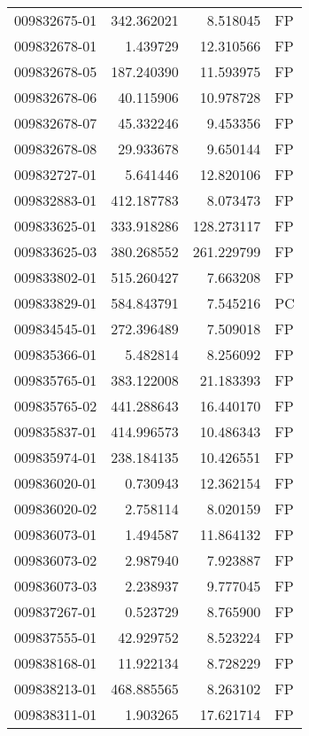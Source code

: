 \begin{tabular}{lrrl}
009832675-01 &  342.362021 &       8.518045 &   FP \\
009832678-01 &    1.439729 &      12.310566 &   FP \\
009832678-05 &  187.240390 &      11.593975 &   FP \\
009832678-06 &   40.115906 &      10.978728 &   FP \\
009832678-07 &   45.332246 &       9.453356 &   FP \\
009832678-08 &   29.933678 &       9.650144 &   FP \\
009832727-01 &    5.641446 &      12.820106 &   FP \\
009832883-01 &  412.187783 &       8.073473 &   FP \\
009833625-01 &  333.918286 &     128.273117 &   FP \\
009833625-03 &  380.268552 &     261.229799 &   FP \\
009833802-01 &  515.260427 &       7.663208 &   FP \\
009833829-01 &  584.843791 &       7.545216 &   PC \\
009834545-01 &  272.396489 &       7.509018 &   FP \\
009835366-01 &    5.482814 &       8.256092 &   FP \\
009835765-01 &  383.122008 &      21.183393 &   FP \\
009835765-02 &  441.288643 &      16.440170 &   FP \\
009835837-01 &  414.996573 &      10.486343 &   FP \\
009835974-01 &  238.184135 &      10.426551 &   FP \\
009836020-01 &    0.730943 &      12.362154 &   FP \\
009836020-02 &    2.758114 &       8.020159 &   FP \\
009836073-01 &    1.494587 &      11.864132 &   FP \\
009836073-02 &    2.987940 &       7.923887 &   FP \\
009836073-03 &    2.238937 &       9.777045 &   FP \\
009837267-01 &    0.523729 &       8.765900 &   FP \\
009837555-01 &   42.929752 &       8.523224 &   FP \\
009838168-01 &   11.922134 &       8.728229 &   FP \\
009838213-01 &  468.885565 &       8.263102 &   FP \\
009838311-01 &    1.903265 &      17.621714 &   FP \\

\end{tabular}
